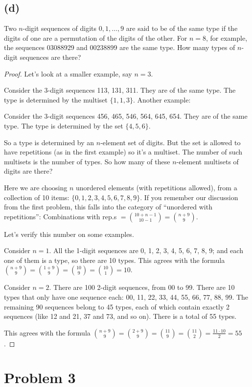 \documentclass[14pt]{extarticle}
\begin{document}
\subsection{(d)}
Two $n$-digit sequences of digits $0,1,\ldots,9$ are said to be of the same type if the digits of one are a permutation of the digits of the other. For $n = 8$, for example, the sequences 03088929 and 00238899 are the same type. How many types of $n$-digit sequences are there?
\begin{proof}
Let's look at a smaller example, say $n = 3$.

Consider the 3-digit sequences 113, 131, 311. They are of the same type. The type is determined by the multiset $\{1,1,3\}$. Another example:

Consider the 3-digit sequences 456, 465, 546, 564, 645, 654. They are of the same type. The type is determined by the set $\{4,5,6\}$.

So a type is determined by an $n$-element set of digits. But the set is allowed to have repetitions (as in the first example) so it's a multiset. The number of such multisets is the number of types. So how many of these $n$-element multisets of digits are there?

Here we are choosing $n$ unordered elements (with repetitions allowed), from a collection of 10 items: $\{0,1,2,3,4,5,6,7,8,9\}$. If you remember our discussion from the first problem, this falls into the category of ``unordered with repetitions'': Combinations with rep.s $\displaystyle = \binom{10+n-1}{10-1} = \binom{n+9}{9}$.

Let's verify this number on some examples. 

Consider $n = 1$. All the 1-digit sequences are 0, 1, 2, 3, 4, 5, 6, 7, 8, 9; and each one of them is a type, so there are 10 types. This agrees with the formula $\binom{n+9}{9} = \binom{1+9}{9} = \binom{10}{9} = \binom{10}{1} = 10$.

Consider $n = 2$. There are 100 2-digit sequences, from 00 to 99. There are 10 types that only have one sequence each: 00, 11, 22, 33, 44, 55, 66, 77, 88, 99. The remaining 90 sequences belong to 45 types, each of which contain exactly 2 sequences (like 12 and 21, 37 and 73, and so on). There is a total of 55 types.

This agrees with the formula $\binom{n+9}{9} = \binom{2+9}{9} = \binom{11}{9} = \binom{11}{2} = \frac{11 \cdot 10}{2} = 55$.
\end{proof}

\section{Problem 3}
\end{document}
